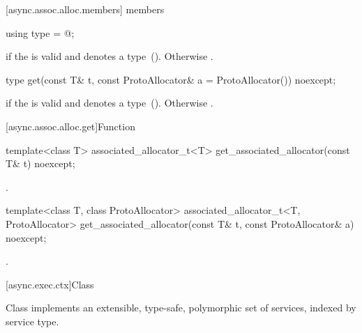 [async.assoc.alloc.members]{ members}

\begin{itemdecl}
using type = @\seebelow@;
\end{itemdecl}

\begin{itemdescr}
\pnum
\ctype {} if the  
is valid and denotes a type~().
Otherwise .
\end{itemdescr}

\begin{itemdecl}
type get(const T& t, const ProtoAllocator& a = ProtoAllocator()) noexcept;
\end{itemdecl}

\begin{itemdescr}
\pnum
\returns {} if the  
is valid and denotes a type~().
Otherwise .
\end{itemdescr}



[async.assoc.alloc.get]{Function }

%
\begin{itemdecl}
template<class T>
  associated_allocator_t<T> get_associated_allocator(const T& t) noexcept;
\end{itemdecl}

\begin{itemdescr}
\pnum
\returns {}.
\end{itemdescr}

\begin{itemdecl}
template<class T, class ProtoAllocator>
  associated_allocator_t<T, ProtoAllocator>
    get_associated_allocator(const T& t, const ProtoAllocator& a) noexcept;
\end{itemdecl}

\begin{itemdescr}
\pnum
\returns {}.
\end{itemdescr}



[async.exec.ctx]{Class }

%
\pnum
Class  implements an extensible, type-safe, polymorphic set of services, indexed by service type.

